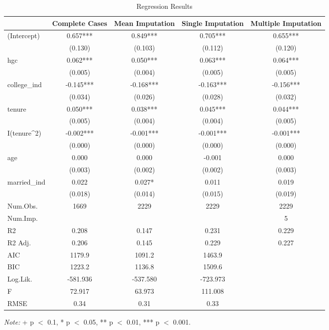 \documentclass{article}
\begin{document}
\begin{table}[ht]
\centering
\caption{Regression Results}
\begin{tabular}{l c c c c}
\toprule
& \textbf{Complete Cases} & \textbf{Mean Imputation} & \textbf{Single Imputation} & \textbf{Multiple Imputation} \\ 
\midrule 
(Intercept) & 0.657*** & 0.849*** & 0.705*** & 0.655*** \\
& (0.130) & (0.103) & (0.112) & (0.120) \\
hgc & 0.062*** & 0.050*** & 0.063*** & 0.064*** \\
& (0.005) & (0.004) & (0.005) & (0.005) \\
college\_ind & -0.145*** & -0.168*** & -0.163*** & -0.156*** \\
& (0.034) & (0.026) & (0.028) & (0.032) \\
tenure & 0.050*** & 0.038*** & 0.045*** & 0.044*** \\
& (0.005) & (0.004) & (0.004) & (0.005) \\
I(tenure\textasciicircum{}2) & -0.002*** & -0.001*** & -0.001*** & -0.001*** \\
& (0.000) & (0.000) & (0.000) & (0.000) \\
age & 0.000 & 0.000 & -0.001 & 0.000 \\
& (0.003) & (0.002) & (0.002) & (0.003) \\
married\_ind & 0.022 & 0.027* & 0.011 & 0.019 \\
& (0.018) & (0.014) & (0.015) & (0.019) \\
\midrule
Num.Obs. & 1669 & 2229 & 2229 & 2229 \\
Num.Imp. & & & & 5 \\
R2 & 0.208 & 0.147 & 0.231 & 0.229 \\
R2 Adj. & 0.206 & 0.145 & 0.229 & 0.227 \\
AIC & 1179.9 & 1091.2 & 1463.9 & \\
BIC & 1223.2 & 1136.8 & 1509.6 & \\
Log.Lik. & -581.936 & -537.580 & -723.973 & \\
F & 72.917 & 63.973 & 111.008 & \\
RMSE & 0.34 & 0.31 & 0.33 & \\
\bottomrule
\end{tabular}
\vspace{0.5cm} %
\parbox{\textwidth}{
\small \textit{Note:} + p $<$ 0.1, * p $<$ 0.05, ** p $<$ 0.01, *** p $<$ 0.001.
}
\end{table}
\end{document}
